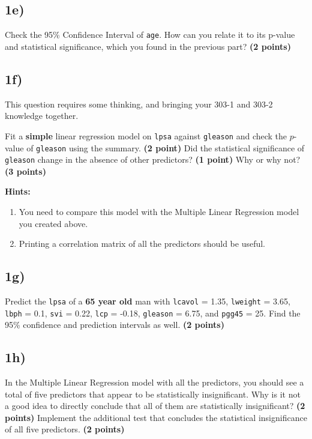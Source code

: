 \documentclass[
  letterpaper,
  DIV=11,
  numbers=noendperiod]{scrreprt}
\providecommand{\tightlist}{%
  \setlength{\itemsep}{0pt}\setlength{\parskip}{0pt}}\usepackage{longtable,booktabs,array}
\begin{document}
\subsection{1e)}\label{e-1}

Check the 95\% Confidence Interval of \texttt{age}. How can you relate
it to its p-value and statistical significance, which you found in the
previous part? \textbf{(2 points)}

\subsection{1f)}\label{f-1}

This question requires some thinking, and bringing your 303-1 and 303-2
knowledge together.

Fit a \textbf{simple} linear regression model on \texttt{lpsa} against
\texttt{gleason} and check the \(p\)-value of \texttt{gleason} using the
summary. \textbf{(2 point)} Did the statistical significance of
\texttt{gleason} change in the absence of other predictors? \textbf{(1
point)} Why or why not? \textbf{(3 points)}

\textbf{Hints:}

\begin{enumerate}
\def\labelenumi{\arabic{enumi})}
\tightlist
\item
  You need to compare this model with the Multiple Linear Regression
  model you created above.
\item
  Printing a correlation matrix of all the predictors should be useful.
\end{enumerate}

\subsection{1g)}\label{g-1}

Predict the \texttt{lpsa} of a \textbf{65 year old} man with
\texttt{lcavol} = 1.35, \texttt{lweight} = 3.65, \texttt{lbph} = 0.1,
\texttt{svi} = 0.22, \texttt{lcp} = -0.18, \texttt{gleason} = 6.75, and
\texttt{pgg45} = 25. Find the 95\% confidence and prediction intervals
as well. \textbf{(2 points)}

\subsection{1h)}\label{h-1}

In the Multiple Linear Regression model with all the predictors, you
should see a total of five predictors that appear to be statistically
insignificant. Why is it not a good idea to directly conclude that all
of them are statistically insignificant? \textbf{(2 points)} Implement
the additional test that concludes the statistical insignificance of all
five predictors. \textbf{(2 points)}
\end{document}
